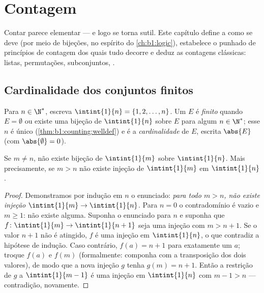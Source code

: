 \chapter{Contagem}\label{ch:b1:counting}

Contar  parece elementar --- e logo se torna sutil.
Este capítulo define a  como se deve (por meio de bijeções,
no espírito do \cref{ch:b1:logic}), estabelece o punhado de princípios de
contagem dos quais tudo decorre e deduz as contagens clássicas: listas,
permutações, subconjuntos, .

\section{Cardinalidade dos conjuntos finitos}

\begin{definition}\label{def:b1:counting:card}
Para $n \in \N^*$, escreva $\intint{1}{n} = \{1, 2, \dots,
n\}$. Um  $E$ é \emph{finito} quando $E = \emptyset$
ou existe uma bijeção de $\intint{1}{n}$ sobre $E$ para
algum $n \in \N^*$; esse $n$ é único (\cref{thm:b1:counting:welldef})
e é a \emph{cardinalidade} de $E$, escrita
$\abs{E}$ (com $\abs{\emptyset} = 0$).
\end{definition}

\begin{theorem}\label{thm:b1:counting:welldef}
Se $m \neq n$, não existe bijeção de $\intint{1}{m}$
sobre $\intint{1}{n}$. Mais precisamente, se $m > n$ não existe
injeção de $\intint{1}{m}$ em $\intint{1}{n}$.
\end{theorem}

\begin{proof}
Demonstramos por indução em $n$ o enunciado: \emph{para todo $m > n$,
não existe injeção $\intint{1}{m} \to \intint{1}{n}$}. Para $n = 0$ o contradomínio é vazio e $m \geq 1$: não existe
 alguma. Suponha o enunciado para $n$ e suponha que $f \colon
\intint{1}{m} \to \intint{1}{n+1}$ seja uma
injeção com $m > n + 1$. Se o valor $n + 1$ não é atingido, $f$
é uma injeção em $\intint{1}{n}$, o que contradiz a hipótese de
indução. Caso contrário, $f(a) = n + 1$ para exatamente um $a$;
troque $f(a)$ e $f(m)$ (formalmente: componha com a transposição dos
dois valores), de modo que a nova injeção $g$ tenha $g(m) = n + 1$.
Então a restrição de $g$ a $\intint{1}{m-1}$ é uma
injeção em $\intint{1}{n}$ com $m - 1 > n$ ---
contradição, novamente.
\end{proof}

